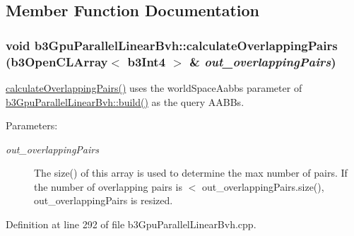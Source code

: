 \subsection{Member Function Documentation}
\hypertarget{classb3_gpu_parallel_linear_bvh_c0208fca9279bdfd66eabd321d98420b}{
\subsubsection[calculateOverlappingPairs]{\setlength{\rightskip}{0pt plus 5cm}void b3GpuParallelLinearBvh::calculateOverlappingPairs (b3OpenCLArray$<$ b3Int4 $>$ \& {\em out\_\-overlappingPairs})}}
\label{classb3_gpu_parallel_linear_bvh_c0208fca9279bdfd66eabd321d98420b}


\hyperlink{classb3_gpu_parallel_linear_bvh_c0208fca9279bdfd66eabd321d98420b}{calculateOverlappingPairs()} uses the worldSpaceAabbs parameter of \hyperlink{classb3_gpu_parallel_linear_bvh_c6e619d22cc2bd9c979900cf83d59143}{b3GpuParallelLinearBvh::build()} as the query AABBs. \begin{Desc}
\item[Parameters:]
\begin{description}
\item[{\em out\_\-overlappingPairs}]The size() of this array is used to determine the max number of pairs. If the number of overlapping pairs is $<$ out\_\-overlappingPairs.size(), out\_\-overlappingPairs is resized. \end{description}
\end{Desc}


Definition at line 292 of file b3GpuParallelLinearBvh.cpp.

